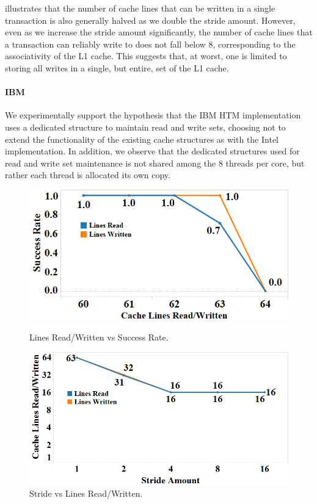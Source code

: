  illustrates that the number of cache
lines that can be written in a single transaction 
is also generally halved as we
double the stride amount.  However, even as we increase the stride amount
significantly, the number of cache lines that a 
transaction can reliably write
to does not fall below 8, corresponding to the associativity 
of the L1 cache.  This suggests that, at worst, one is limited 
to storing all writes in a single, but entire, set of the L1 cache.

\paragraph{IBM}
We experimentally support the hypothesis
that the IBM HTM implementation uses a dedicated structure
to maintain read and write sets, choosing not to extend the 
functionality of the existing cache structures as with
the Intel implementation.  In addition, we observe
that the dedicated structures used for read and write set
maintenance is not shared among the 8 threads per core, but rather
each thread is allocated its own copy.

\begin{figure}[h]%
\centering
\begin{minipage}[b]{.45\linewidth}
\centering
\includegraphics[width=\linewidth]{images/wttm_capacity_readwrite_ibm}
\vspace{-25pt}
\caption{Lines Read/Written vs Success Rate.}
\label{fig:wttm_capacity_readwrite_ibm}
\end{minipage}%
\quad
\begin{minipage}[b]{.45\linewidth}%
\centering
\includegraphics[width=\linewidth]{images/wttm_stride_readwrite_ibm}
\vspace{-25pt}
\caption{Stride vs Lines Read/Written.}
\label{fig:wttm_stride_readwrite_ibm}
\end{minipage}
\end{figure}

